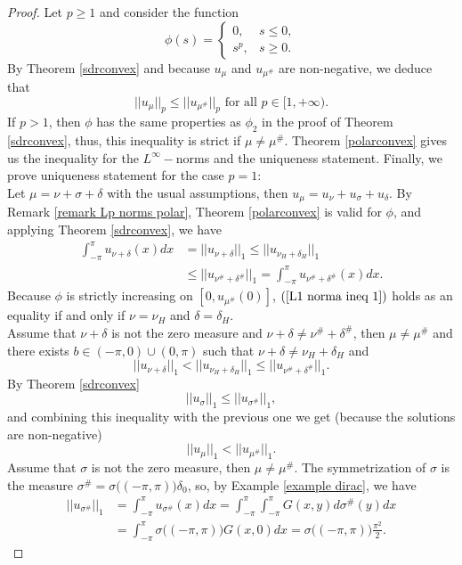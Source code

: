 \documentclass[11pt]{amsart}
\numberwithin{equation}{section}
\begin{document}
\begin{proof}
 Let \(p\geq1\) and consider the function 
\[
\phi(s)=
\begin{cases}
0, & s\leq0,\\
s^p, &s\geq0.
\end{cases}
\]
By Theorem \ref{sdrconvex} and because \(u_\mu\) and \(u_{\mu^\#}\) are non-negative, we deduce that
\[||u_\mu||_p\leq||u_{\mu^\#}||_p\text{ for all }p\in[1,+\infty).\]
If \(p>1\), then \(\phi\) has the same properties as \(\phi_2\) in the proof of Theorem \ref{sdrconvex}, thus, this inequality is strict if \(\mu\neq\mu^\#.\) Theorem \ref{polarconvex} gives us the inequality for the \(L^\infty-\)norms and the uniqueness statement. Finally, we prove uniqueness statement for the case \(p=1\):\\
Let \(\mu=\nu+\sigma+\delta\) with the usual assumptions, then \(u_\mu=u_\nu+u_\sigma+u_\delta\). By Remark \ref{remark Lp norms polar}, Theorem \ref{polarconvex} is valid for \(\phi\), and applying Theorem \ref{sdrconvex}, we have
\begin{align}
\label{L1 norma ineq 1}\int_{-\pi}^\pi u_{\nu+\delta}(x)dx&=||u_{\nu+\delta}||_1\leq||u_{\nu_H+\delta_H}||_1\\
\nonumber&\leq||u_{\nu^\#+\delta^\#}||_1=\int_{-\pi}^\pi u_{\nu^\#+\delta^\#}(x)dx.
\end{align}
Because \(\phi\) is strictly increasing on \([0,u_{\mu^\#}(0)]\), \((\ref{L1 norma ineq 1})\) holds as an equality if and only if \(\nu=\nu_H\) and \(\delta=\delta_H\).\\
Assume that \(\nu+\delta\) is not the zero measure and \(\nu+\delta\neq\nu^\#+\delta^\#\), then \(\mu\neq\mu^\#\) and there exists \(b\in(-\pi,0)\cup(0,\pi)\) such that \(\nu+\delta\neq\nu_H+\delta_H\) and
\[||u_{\nu+\delta}||_1<||u_{\nu_H+\delta_H}||_1\leq||u_{\nu^\#+\delta^\#}||_1.\]
By Theorem \ref{sdrconvex}
\[||u_\sigma||_1\leq||u_{\sigma^\#}||_1,\]
and combining this inequality with the previous one we get (because the solutions are non-negative)
\[||u_\mu||_1<||u_{\mu^\#}||_1.\]
Assume that \(\sigma\) is not the zero measure, then \(\mu\neq\mu^\#\). The symmetrization of \(\sigma\) is the measure \(\sigma^\#=\sigma\bigl((-\pi,\pi)\bigr)\delta_0\), so, by Example \ref{example dirac}, we have
\begin{align}
\nonumber||u_{\sigma^\#}||_1&=\int_{-\pi}^\pi u_{\sigma^\#}(x)dx=\int_{-\pi}^\pi\int_{-\pi}^\pi G(x,y)d\sigma^\#(y)dx\\
\nonumber&=\int_{-\pi}^\pi\sigma\bigl((-\pi,\pi)\bigr)G(x,0)dx=\sigma\bigl((-\pi,\pi)\bigr)\frac{\pi^2}{2}.

\end{align}
\end{proof}
\end{document}
